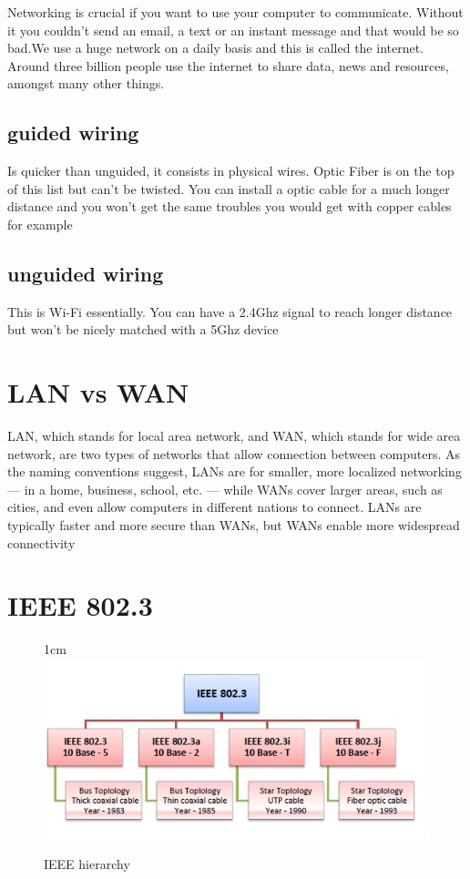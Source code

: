 \documentclass[a4paper,12pt]{article}
\begin{document}


\newline \noindent Networking is crucial if you want to use your computer to communicate. Without it you couldn’t send an email, a text or an instant message and that would be so bad.We use a huge network on a daily basis and this is called the internet. Around three billion people use the internet to share data, news and resources, amongst many other things.
\clearpage
\subsection{guided wiring}
Is quicker than unguided, it consists in physical wires. Optic Fiber is on the top of this list but can't be twisted. You can install a optic cable for a much longer distance and you won't get the same troubles you would get with copper cables for example

\subsection{unguided wiring}
This is Wi-Fi essentially. You can have a 2.4Ghz signal to reach longer distance but won't be nicely matched with a 5Ghz device

\section{LAN vs WAN}

LAN, which stands for local area network, and WAN, which stands for wide area network, are two types of networks that allow connection between computers. As the naming conventions suggest, LANs are for smaller, more localized networking — in a home, business, school, etc. — while WANs cover larger areas, such as cities, and even allow computers in different nations to connect. LANs are typically faster and more secure than WANs, but WANs enable more widespread connectivity



\section{IEEE 802.3}

\begin{figure}[16]{1cm}
\centering
\includegraphics[width=15cm]{./ieee_802.jpg}
\vspace{-15pt}
\caption{IEEE hierarchy}\label{wrap-fig:5}
\end{figure}
\end{document}
